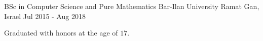\begin{cventries}
  \cventry
    {BSc in Computer Science and Pure Mathematics} %
    {Bar-Ilan University} %
    {Ramat Gan, Israel} %
    {Jul 2015 - Aug 2018} %
    {
      \begin{cvitems} %
      \item{Graduated with honors at the age of $17$.}
      \end{cvitems}
    }
    
\end{cventries}
